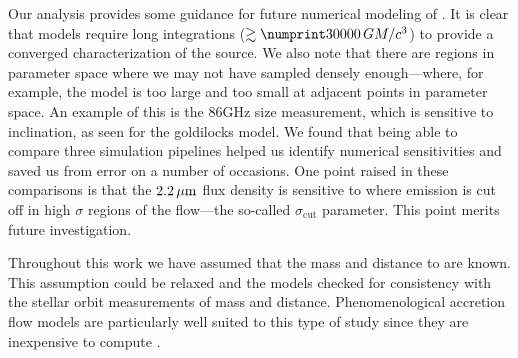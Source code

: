 Our analysis provides some guidance for future numerical modeling of \sgra.
It is clear that models require long integrations ($\gtrsim \no{30000}\,\tg$) to provide a converged characterization of the source.
We also note that there are regions in parameter space where we may not have sampled densely enough---where, for example, the model is too large and too small at adjacent points in parameter space.
An example of this is the 86GHz size measurement, which is sensitive to inclination, as seen for the goldilocks model.
We found that being able to compare three simulation pipelines helped us identify numerical sensitivities and saved us from error on a number of occasions.
One point raised in these comparisons is that the $2.2\,\mu\mathrm{m}$ flux density is sensitive to where emission is cut off in high $\sigma$ regions of the flow---the so-called $\sigma_\mathrm{cut}$ parameter.
This point merits future investigation.

Throughout this work we have assumed that the mass and distance to \sgra are known.
This assumption could be relaxed and the models checked for consistency with the stellar orbit measurements of mass and distance. 
Phenomenological accretion flow models are particularly well suited to this type of study since they are inexpensive to compute \citep[e.g.,][]{2009ApJ...697...45B}.
